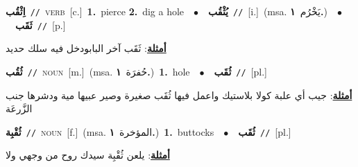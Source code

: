 \documentclass[10pt,a4paper,twoside]{article} %
\begin{document}
\begin{multicols}{2}
{{{{{{\setlength\topsep{0pt}\textbf{\foreignlanguage{arabic}{اِثْقُب}}\ {\color{gray}\texttt{//}\color{black}}\ \textsc{verb}\ [c.]\ \textbf{1.}~pierce  \textbf{2.}~dig a hole\ \ $\bullet$\ \ \setlength\topsep{0pt}\textbf{\foreignlanguage{arabic}{يُثْقُب}}\ {\color{gray}\texttt{//}\color{black}}\ [i.]\ \color{gray}(msa. \foreignlanguage{arabic}{يَخْرُم}~\foreignlanguage{arabic}{\textbf{١.}})\color{black}\ \ $\bullet$\ \ \setlength\topsep{0pt}\textbf{\foreignlanguage{arabic}{ثَقَب}}\ {\color{gray}\texttt{//}\color{black}}\ [p.]\  \begin{flushright}\color{gray}\foreignlanguage{arabic}{\textbf{\underline{\foreignlanguage{arabic}{أمثلة}}}: ثَقَب آخر البابودخل فيه سلك حديد}\end{flushright}\color{black}} \vspace{2mm}

{\setlength\topsep{0pt}\textbf{\foreignlanguage{arabic}{ثُقُب}}\ {\color{gray}\texttt{//}\color{black}}\ \textsc{noun}\ [m.]\ \color{gray}(msa. \foreignlanguage{arabic}{حُفرَة}~\foreignlanguage{arabic}{\textbf{١.}})\color{black}\ \textbf{1.}~hole\ \ $\bullet$\ \ \setlength\topsep{0pt}\textbf{\foreignlanguage{arabic}{ثُقَب}}\ {\color{gray}\texttt{//}\color{black}}\ [pl.]\  \begin{flushright}\color{gray}\foreignlanguage{arabic}{\textbf{\underline{\foreignlanguage{arabic}{أمثلة}}}: جيب أي علبة كولا بلاستيك واعمل فيها ثُقَب صغيرة وصير عبيها مية ودشرها جنب الزَّرعَة}\end{flushright}\color{black}} \vspace{2mm}

{\setlength\topsep{0pt}\textbf{\foreignlanguage{arabic}{ثُقْبِة}}\ {\color{gray}\texttt{//}\color{black}}\ \textsc{noun}\ [f.]\ \color{gray}(msa. \foreignlanguage{arabic}{المؤخرة}~\foreignlanguage{arabic}{\textbf{١.}})\color{black}\ \textbf{1.}~buttocks\ \ $\bullet$\ \ \setlength\topsep{0pt}\textbf{\foreignlanguage{arabic}{ثُقَب}}\ {\color{gray}\texttt{//}\color{black}}\ [pl.]\  \begin{flushright}\color{gray}\foreignlanguage{arabic}{\textbf{\underline{\foreignlanguage{arabic}{أمثلة}}}: يلعن ثُقْبِة سيدك روح من وجهي ولا}\end{flushright}\color{black}} \vspace{2mm}

}}}}}
\end{multicols}
\end{document}
